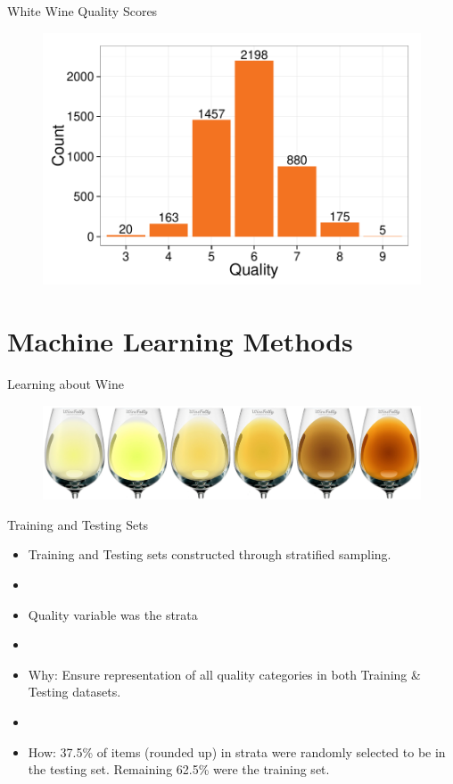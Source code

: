 \documentclass{beamer}
\begin{document}
\begin{frame}{White Wine Quality Scores}
\begin{figure}
	\centering
	\includegraphics[width=\textwidth]{../images/white_hist.pdf}
\end{figure}
\end{frame}

\section{Machine Learning Methods}

\begin{frame}{Learning about Wine}
	\begin{figure}
		\centering
		\includegraphics[width=\textwidth]{../images/gradient.jpg}
	\end{figure}
\end{frame}

\begin{frame}{Training and Testing Sets}
	\begin{itemize}
	\item Training and Testing sets constructed through stratified sampling.
	\item[]
	\item Quality variable was the strata
	\item[]
	\item Why: Ensure representation of all quality categories in both Training \& Testing datasets.
	\item[]
	\item How: 37.5\% of items (rounded up) in strata were randomly selected to be in the testing set. Remaining 62.5\% were the training set.
	\end{itemize}
\end{frame}
\end{document}

